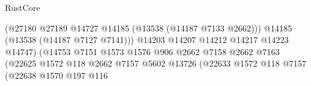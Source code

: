 \begin{lexlean}{RustCore}
\begin{coremodule}
                                                                (@27180
                                                                  @27189
                                                                  @14727
                                                                  @14185
                                                                  (@13538 (@14187 @7133 @2662)))
                                                                @14185
                                                                (@13538 (@14187 @7127 @7141)))
                                                              @14203
                                                              @14207
                                                              @14212
                                                              @14217
                                                              @14223
                                                              @14747)
                                                            (@14753
                                                              @7151
                                                              @1573
                                                              @1576
                                                              @906
                                                              @2662
                                                              @7158
                                                              @2662
                                                              @7163
                                                              (@22625
                                                                @1572
                                                                @118
                                                                @2662
                                                                @7157
                                                                @5602
                                                                @13726
                                                                (@22633
                                                                  @1572
                                                                  @118
                                                                  @7157
                                                                  (@22638
                                                                    @1570
                                                                    @197
                                                                    @116

\end{coremodule}
\end{lexlean}
